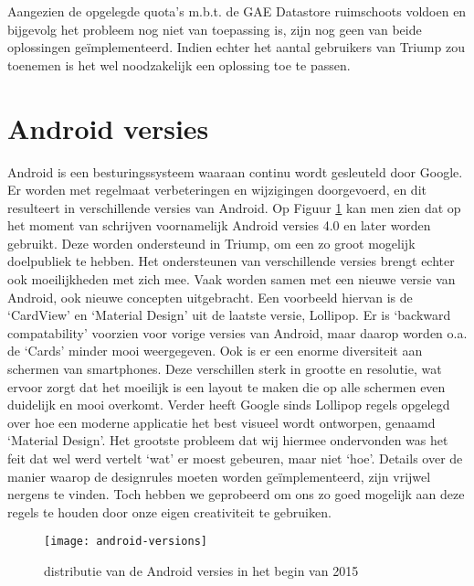Aangezien de opgelegde quota's m.b.t. de GAE Datastore ruimschoots voldoen en bijgevolg het probleem nog niet van toepassing is, zijn nog geen van beide oplossingen geïmplementeerd.
Indien echter het aantal gebruikers van Triump zou toenemen is het wel noodzakelijk een oplossing toe te passen.

\section{Android versies}

Android is een besturingssysteem waaraan continu wordt gesleuteld door Google. Er worden met regelmaat verbeteringen en wijzigingen doorgevoerd, en dit resulteert in verschillende versies van Android.
Op Figuur \ref{fig:android_versions} kan men zien dat op het moment van schrijven voornamelijk Android versies 4.0 en later worden gebruikt. Deze worden ondersteund in Triump, om een zo groot mogelijk doelpubliek te hebben. Het ondersteunen van verschillende versies brengt echter ook moeilijkheden met zich mee. Vaak worden samen met een nieuwe versie van Android, ook nieuwe concepten uitgebracht.
Een voorbeeld hiervan is de `CardView' en `Material Design' uit de laatste versie, Lollipop. Er is `backward compatability' voorzien voor vorige versies van Android, maar daarop worden o.a. de `Cards' minder mooi weergegeven.
Ook is er een enorme diversiteit aan schermen van smartphones. Deze verschillen sterk in grootte en resolutie, wat ervoor zorgt dat het moeilijk is een layout te maken die op alle schermen even duidelijk en mooi overkomt.
Verder heeft Google sinds Lollipop regels opgelegd over hoe een moderne applicatie het best visueel wordt ontworpen, genaamd `Material Design'. Het grootste probleem dat wij hiermee ondervonden was het feit dat wel werd vertelt `wat' er moest gebeuren, maar niet `hoe'. Details over de manier waarop de designrules moeten worden geïmplementeerd, zijn vrijwel nergens te vinden. Toch hebben we geprobeerd om ons zo goed mogelijk aan deze regels te houden door onze eigen creativiteit te gebruiken.
\begin{figure}[H]
	\centering
	\texttt{[image: android-versions]}
	\caption{distributie van de Android versies in het begin van 2015}
	\label{fig:android_versions}
\end{figure}

